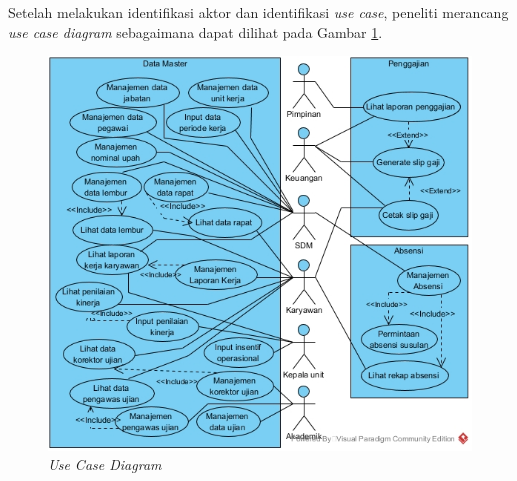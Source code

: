 \begin{enumerate}
			        Setelah melakukan identifikasi aktor dan identifikasi \emph{use case}, peneliti merancang \emph{use case diagram} sebagaimana dapat dilihat pada Gambar \ref{usecase}.
			        \begin{figure}[H]
    		            \centering    		            \includegraphics[width=15cm]{gambar/use-case-diagram}
    		            \caption{\emph{Use Case Diagram}}
    		            \label{usecase}
    		            \end{figure}
    			    \end{enumerate}
			        
			
